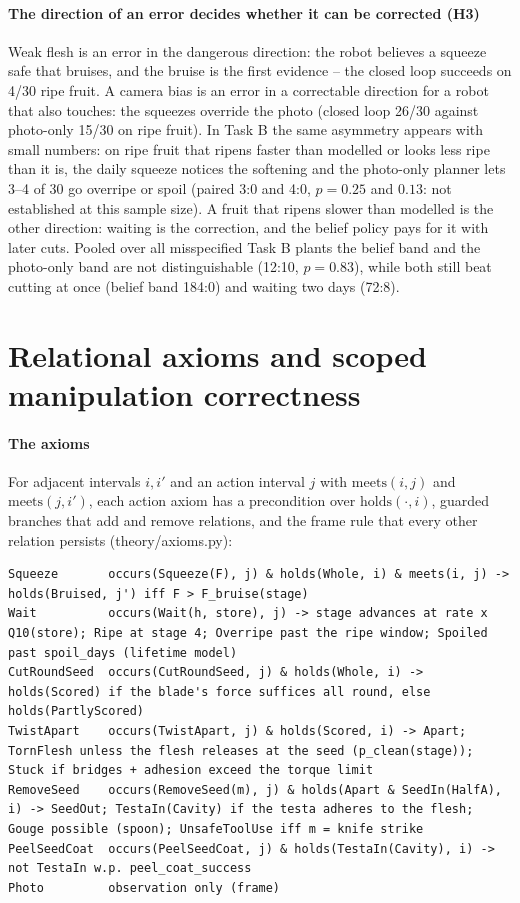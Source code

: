 \documentclass[10.5pt,a4paper]{article}
\newcommand{\holds}{\mathrm{holds}}\newcommand{\occurs}{\mathrm{occurs}}\newcommand{\meets}{\mathrm{meets}}
\begin{document}
\paragraph{The direction of an error decides whether it can be corrected (H3)} Weak flesh is an error in the
dangerous direction: the robot believes a squeeze safe that bruises, and the bruise is the first evidence -- the
closed loop succeeds on 4/30 ripe fruit. A camera bias is an error in a correctable
direction for a robot that also touches: the squeezes override the photo (closed loop 26/30 against photo-only 15/30 on ripe fruit). In Task B the same asymmetry appears with
small numbers: on ripe fruit that ripens faster than modelled or looks less ripe than it is, the daily squeeze
notices the softening and the photo-only planner lets 3--4 of 30 go overripe or spoil (paired 3:0 and 4:0,
$p=0.25$ and $0.13$: not established at this sample size). A fruit that ripens slower than modelled is the other
direction: waiting is the correction, and the belief policy pays for it with later cuts. Pooled over all misspecified
Task B plants the belief band and the photo-only band are not distinguishable (12:10, $p=0.83$), while both still beat cutting at once
(belief band 184:0) and
waiting two days (72:8).
\section{Relational axioms and scoped manipulation correctness}
\paragraph{The axioms} For adjacent intervals $i,i'$ and an action interval $j$ with $\meets(i,j)$ and
$\meets(j,i')$, each action axiom has a precondition over $\holds(\cdot,i)$, guarded branches that add and remove
relations, and the frame rule that every other relation persists (theory/axioms.py):
\par\medskip{}\par\nopagebreak\vspace{2pt}\begin{Verbatim}[fontsize=\scriptsize,frame=lines,framesep=2mm,breaklines]
Squeeze       occurs(Squeeze(F), j) & holds(Whole, i) & meets(i, j) -> holds(Bruised, j') iff F > F_bruise(stage)
Wait          occurs(Wait(h, store), j) -> stage advances at rate x Q10(store); Ripe at stage 4; Overripe past the ripe window; Spoiled past spoil_days (lifetime model)
CutRoundSeed  occurs(CutRoundSeed, j) & holds(Whole, i) -> holds(Scored) if the blade's force suffices all round, else holds(PartlyScored)
TwistApart    occurs(TwistApart, j) & holds(Scored, i) -> Apart; TornFlesh unless the flesh releases at the seed (p_clean(stage)); Stuck if bridges + adhesion exceed the torque limit
RemoveSeed    occurs(RemoveSeed(m), j) & holds(Apart & SeedIn(HalfA), i) -> SeedOut; TestaIn(Cavity) if the testa adheres to the flesh; Gouge possible (spoon); UnsafeToolUse iff m = knife strike
PeelSeedCoat  occurs(PeelSeedCoat, j) & holds(TestaIn(Cavity), i) -> not TestaIn w.p. peel_coat_success
Photo         observation only (frame)
\end{Verbatim}
\end{document}
